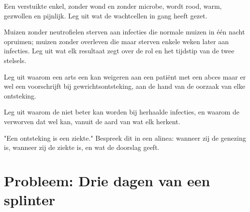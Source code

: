 \begin{exercise}[$\star\star$]\label{exo:g12:innate-immunity:11}
Een verstuikte enkel, zonder wond en zonder microbe, wordt rood, warm,
gezwollen en pijnlijk. Leg uit wat de wachtcellen in gang heeft gezet.
\end{exercise}

\begin{exercise}[$\star\star\star$]\label{exo:g12:innate-immunity:12}
Muizen zonder neutrofielen sterven aan infecties die normale muizen in
één nacht opruimen; muizen zonder  overleven die maar
sterven enkele weken later aan infecties. Leg uit wat elk resultaat zegt
over de rol en het tijdstip van de twee stelsels.
\end{exercise}

\begin{exercise}[$\star\star\star$]\label{exo:g12:innate-immunity:13}
Leg uit waarom een arts een  kan weigeren aan een patiënt
met een abces maar er wel een voorschrijft bij gewrichtsontsteking, aan de
hand van de oorzaak van elke ontsteking.
\end{exercise}

\begin{exercise}[$\star\star\star$]\label{exo:g12:innate-immunity:14}
Leg uit waarom de  niet beter kan worden bij herhaalde
infecties, en waarom de verworven dat wel kan, vanuit de aard van wat elk
herkent.
\end{exercise}

\begin{exercise}[$\star\star\star$]\label{exo:g12:innate-immunity:15}
"Een ontsteking is een ziekte." Bespreek dit in een alinea: wanneer zij de
genezing is, wanneer zij de ziekte is, en wat de doorslag geeft.
\end{exercise}

\section{Probleem: Drie dagen van een splinter}

